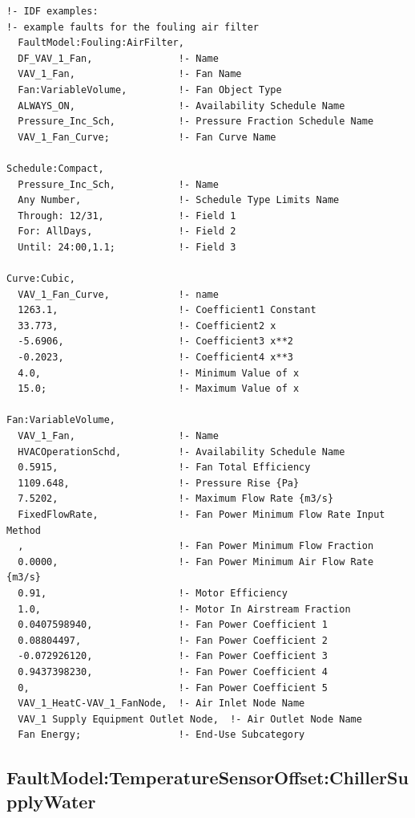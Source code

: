 \begin{lstlisting}
!- IDF examples:
!- example faults for the fouling air filter
  FaultModel:Fouling:AirFilter,
  DF_VAV_1_Fan,               !- Name
  VAV_1_Fan,                  !- Fan Name
  Fan:VariableVolume,         !- Fan Object Type
  ALWAYS_ON,                  !- Availability Schedule Name
  Pressure_Inc_Sch,           !- Pressure Fraction Schedule Name
  VAV_1_Fan_Curve;            !- Fan Curve Name

Schedule:Compact,
  Pressure_Inc_Sch,           !- Name
  Any Number,                 !- Schedule Type Limits Name
  Through: 12/31,             !- Field 1
  For: AllDays,               !- Field 2
  Until: 24:00,1.1;           !- Field 3

Curve:Cubic,
  VAV_1_Fan_Curve,            !- name
  1263.1,                     !- Coefficient1 Constant
  33.773,                     !- Coefficient2 x
  -5.6906,                    !- Coefficient3 x**2
  -0.2023,                    !- Coefficient4 x**3
  4.0,                        !- Minimum Value of x
  15.0;                       !- Maximum Value of x

Fan:VariableVolume,
  VAV_1_Fan,                  !- Name
  HVACOperationSchd,          !- Availability Schedule Name
  0.5915,                     !- Fan Total Efficiency
  1109.648,                   !- Pressure Rise {Pa}
  7.5202,                     !- Maximum Flow Rate {m3/s}
  FixedFlowRate,              !- Fan Power Minimum Flow Rate Input Method
  ,                           !- Fan Power Minimum Flow Fraction
  0.0000,                     !- Fan Power Minimum Air Flow Rate {m3/s}
  0.91,                       !- Motor Efficiency
  1.0,                        !- Motor In Airstream Fraction
  0.0407598940,               !- Fan Power Coefficient 1
  0.08804497,                 !- Fan Power Coefficient 2
  -0.072926120,               !- Fan Power Coefficient 3
  0.9437398230,               !- Fan Power Coefficient 4
  0,                          !- Fan Power Coefficient 5
  VAV_1_HeatC-VAV_1_FanNode,  !- Air Inlet Node Name
  VAV_1 Supply Equipment Outlet Node,  !- Air Outlet Node Name
  Fan Energy;                 !- End-Use Subcategory
\end{lstlisting}

\subsection{FaultModel:TemperatureSensorOffset:ChillerSupplyWater}\label{faultmodeltemperaturesensoroffsetchillersupplywater}

